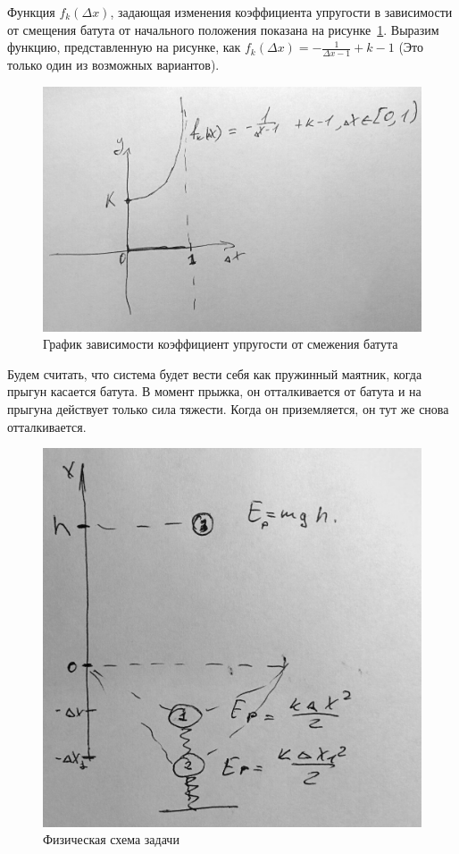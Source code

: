 \documentclass[12pt,a4paper,oneside]{extarticle}
\begin{document}
    Функция $f_k(\Delta x)$, задающая изменения коэффициента упругости в зависимости от смещения батута от начального положения показана на рисунке~\ref{pic:graphic}. Выразим функцию, представленную на рисунке, как $f_k(\Delta x) = -\frac{1}{\Delta x - 1} + k - 1$ (Это только один из возможных вариантов).

    \begin{figure}[h!]
        \center
        \includegraphics[scale=0.3]{f_k.jpg}
        \caption{График зависимости коэффициент упругости от смежения батута}
        \label{pic:graphic}
    \end{figure}

    Будем считать, что система будет вести себя как пружинный маятник, когда прыгун касается батута. В момент прыжка, он отталкивается от батута и на прыгуна действует только сила тяжести. Когда он приземляется, он тут же снова отталкивается.

    \begin{figure}[h!]
        \center
        \includegraphics[scale=0.3]{scheme.jpg}
        \caption{Физическая схема задачи}
        \label{pic:scheme}
    \end{figure}
\end{document}
